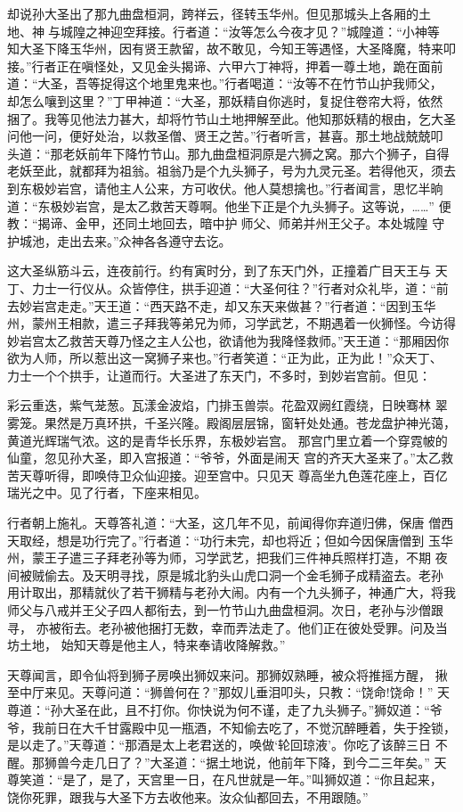 却说孙大圣出了那九曲盘桓洞，跨祥云，径转玉华州。但见那城头上各厢的土
地、神与城隍之神迎空拜接。行者道：“汝等怎么今夜才见？”城隍道：“小神等
知大圣下降玉华州，因有贤王款留，故不敢见，今知王等遇怪，大圣降魔，特来叩
接。”行者正在嗔怪处，又见金头揭谛、六甲六丁神将，押着一尊土地，跪在面前
道：“大圣，吾等捉得这个地里鬼来也。”行者喝道：“汝等不在竹节山护我师父，
却怎么嚷到这里？”丁甲神道：“大圣，那妖精自你逃时，复捉住卷帘大将，依然
捆了。我等见他法力甚大，却将竹节山土地押解至此。他知那妖精的根由，乞大圣
问他一问，便好处治，以救圣僧、贤王之苦。”行者听言，甚喜。那土地战兢兢叩
头道：“那老妖前年下降竹节山。那九曲盘桓洞原是六狮之窝。那六个狮子，自得
老妖至此，就都拜为祖翁。祖翁乃是个九头狮子，号为九灵元圣。若得他灭，须去
到东极妙岩宫，请他主人公来，方可收伏。他人莫想擒也。”行者闻言，思忆半晌
道：“东极妙岩宫，是太乙救苦天尊啊。他坐下正是个九头狮子。这等说，……”
便教：“揭谛、金甲，还同土地回去，暗中护师父、师弟并州王父子。本处城隍
守护城池，走出去来。”众神各各遵守去讫。

这大圣纵筋斗云，连夜前行。约有寅时分，到了东天门外，正撞着广目天王与
天丁、力士一行仪从。众皆停住，拱手迎道：“大圣何往？”行者对众礼毕，道：“前
去妙岩宫走走。”天王道：“西天路不走，却又东天来做甚？”行者道：“因到玉华
州，蒙州王相款，遣三子拜我等弟兄为师，习学武艺，不期遇着一伙狮怪。今访得
妙岩宫太乙救苦天尊乃怪之主人公也，欲请他为我降怪救师。”天王道：“那厢因你
欲为人师，所以惹出这一窝狮子来也。”行者笑道：“正为此，正为此！”众天丁、
力士一个个拱手，让道而行。大圣进了东天门，不多时，到妙岩宫前。但见：

彩云重迭，紫气茏葱。瓦漾金波焰，门排玉兽崇。花盈双阙红霞绕，日映骞林
翠雾笼。果然是万真环拱，千圣兴隆。殿阁层层锦，窗轩处处通。苍龙盘护神光蔼，
黄道光辉瑞气浓。这的是青华长乐界，东极妙岩宫。
那宫门里立着一个穿霓帔的仙童，忽见孙大圣，即入宫报道：“爷爷，外面是闹天
宫的齐天大圣来了。”太乙救苦天尊听得，即唤侍卫众仙迎接。迎至宫中。只见天
尊高坐九色莲花座上，百亿瑞光之中。见了行者，下座来相见。

行者朝上施礼。天尊答礼道：“大圣，这几年不见，前闻得你弃道归佛，保唐
僧西天取经，想是功行完了。”行者道：“功行未完，却也将近；但如今因保唐僧到
玉华州，蒙王子遣三子拜老孙等为师，习学武艺，把我们三件神兵照样打造，不期
夜间被贼偷去。及天明寻找，原是城北豹头山虎口洞一个金毛狮子成精盗去。老孙
用计取出，那精就伙了若干狮精与老孙大闹。内有一个九头狮子，神通广大，将我
师父与八戒并王父子四人都衔去，到一竹节山九曲盘桓洞。次日，老孙与沙僧跟寻，
亦被衔去。老孙被他捆打无数，幸而弄法走了。他们正在彼处受罪。问及当坊土地，
始知天尊是他主人，特来奉请收降解救。”

天尊闻言，即令仙将到狮子房唤出狮奴来问。那狮奴熟睡，被众将推摇方醒，
揪至中厅来见。天尊问道：“狮兽何在？”那奴儿垂泪叩头，只教：“饶命!饶命！”
天尊道：“孙大圣在此，且不打你。你快说为何不谨，走了九头狮子。”狮奴道：“爷
爷，我前日在大千甘露殿中见一瓶酒，不知偷去吃了，不觉沉醉睡着，失于拴锁，
是以走了。”天尊道：“那酒是太上老君送的，唤做‘轮回琼液’。你吃了该醉三日
不醒。那狮兽今走几日了？”大圣道：“据土地说，他前年下降，到今二三年矣。”
天尊笑道：“是了，是了，天宫里一日，在凡世就是一年。”叫狮奴道：“你且起来，
饶你死罪，跟我与大圣下方去收他来。汝众仙都回去，不用跟随。”

